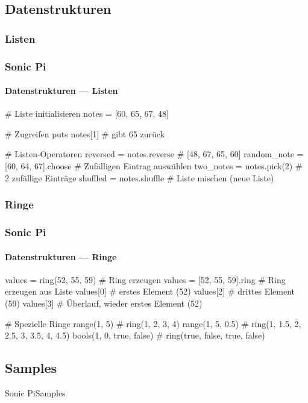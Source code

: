\documentclass{beamer}
\begin{document}
\subsection{Datenstrukturen}
\subsubsection{Listen}
\begin{frame}[fragile]
  \frametitle{Sonic Pi}
  \framesubtitle{Datenstrukturen --- Listen}

  \begin{rubycode}
    # Liste initialisieren
    notes = [60, 65, 67, 48]

    # Zugreifen
    puts notes[1] # gibt 65 zurück

    # Listen-Operatoren
    reversed = notes.reverse          # [48, 67, 65, 60]
    random_note = [60, 64, 67].choose # Zufälligen Eintrag auswählen
    two_notes = notes.pick(2)         # 2 zufällige Einträge
    shuffled = notes.shuffle          # Liste mischen (neue Liste)

  \end{rubycode}
\end{frame}

\subsubsection{Ringe}
\begin{frame}[fragile]
  \frametitle{Sonic Pi}
  \framesubtitle{Datenstrukturen --- Ringe}

  \begin{rubycode}
    values = ring(52, 55, 59)   # Ring erzeugen
    values = [52, 55, 59].ring  # Ring erzeugen aus Liste
    values[0]                   # erstes Element (52)
    values[2]                   # drittes Element (59)
    values[3]                   # Überlauf, wieder erstes Element (52)

    # Spezielle Ringe
    range(1, 5)              # ring(1, 2, 3, 4)
    range(1, 5, 0.5)         # ring(1, 1.5, 2, 2.5, 3, 3.5, 4, 4.5)
    bools(1, 0, true, false) # ring(true, false, true, false)
  \end{rubycode}
\end{frame}

\subsection{Samples}
\begin{frame}[fragile]{Sonic Pi}{Samples}
\end{frame}
\end{document}
